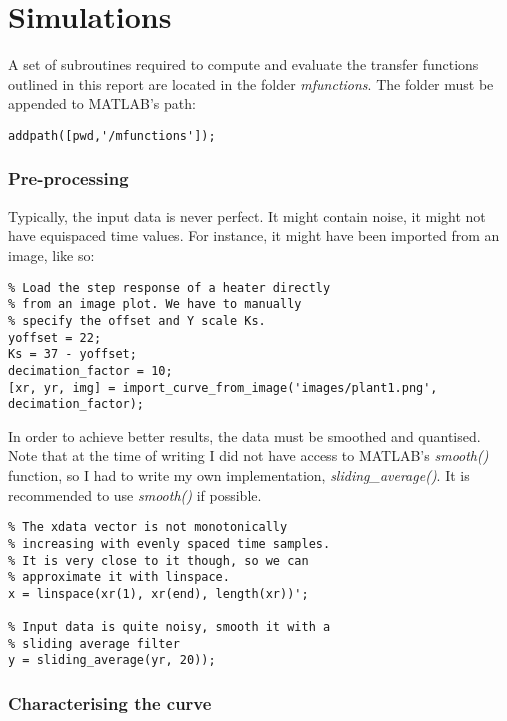 \section{Simulations}

A set  of  subroutines  required  to compute and evaluate the transfer functions
outlined in this report are  located  in  the  folder  \textit{mfunctions}.  The
folder must be appended to MATLAB's path:

\begin{lstlisting}
addpath([pwd,'/mfunctions']);
\end{lstlisting}


\subsubsection*{Pre-processing}

Typically, the input data is never perfect. It might contain noise, it might not
have equispaced time values.  For  instance, it might have been imported from an
image, like so:

\begin{lstlisting}
% Load the step response of a heater directly
% from an image plot. We have to manually
% specify the offset and Y scale Ks.
yoffset = 22;
Ks = 37 - yoffset;
decimation_factor = 10;
[xr, yr, img] = import_curve_from_image('images/plant1.png', decimation_factor);
\end{lstlisting}

In order to achieve better  results,  the  data  must be smoothed and quantised.
Note  that  at  the  time   of  writing  I  did  not  have  access  to  MATLAB's
\textit{smooth()}  function,  so  I  had  to  write   my   own   implementation,
\textit{sliding\_average()}.  It  is recommended  to  use  \textit{smooth()}  if
possible.

\begin{lstlisting}
% The xdata vector is not monotonically
% increasing with evenly spaced time samples.
% It is very close to it though, so we can
% approximate it with linspace.
x = linspace(xr(1), xr(end), length(xr))';

% Input data is quite noisy, smooth it with a
% sliding average filter
y = sliding_average(yr, 20));
\end{lstlisting}


\subsubsection*{Characterising the curve}

